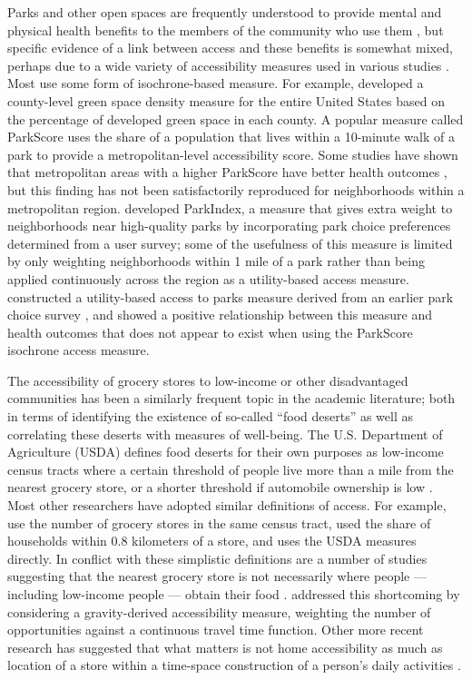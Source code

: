 \documentclass[3p, authoryear, review]{elsarticle} %
\begin{document}
Parks and other open spaces are frequently understood to provide mental and physical
health benefits to the members of the community who use them \citep{bedimo2005}, but
specific evidence of a link between access and these benefits is somewhat mixed,
perhaps due to a wide variety of accessibility measures used in various studies
\citep{bancroft2015association}. Most use some form of isochrone-based measure. For example,
\citet{neusel2016} developed a county-level green space density measure for the entire United
States based on the percentage of developed green space in each county.
A popular measure called ParkScore \citep{parkscore2019} uses the share of a
population that lives within a 10-minute walk of a park to provide a metropolitan-level
accessibility score. Some studies have shown that metropolitan areas with a higher
ParkScore have better health outcomes \citep{rigolon2018}, but this finding has not
been satisfactorily reproduced for neighborhoods within a metropolitan region.
\citet{kacynski2016} developed ParkIndex, a
measure that gives extra weight to neighborhoods near high-quality parks by
incorporating park choice preferences determined from a user survey; some of the
usefulness of this measure is limited by only weighting neighborhoods within 1
mile of a park rather than being applied continuously across the region as a utility-based
access measure. \citet{macfarlane2020} constructed a utility-based access to parks
measure derived from an earlier park choice survey \citep{kinnell2006}, and showed a
positive relationship between this measure and health outcomes that does not
appear to exist when using the ParkScore isochrone access measure.

The accessibility of grocery stores to low-income or other disadvantaged
communities has been a similarly frequent topic in the academic literature;
both in terms of identifying the existence of so-called ``food deserts'' as well
as correlating these deserts with measures of well-being. The U.S. Department of
Agriculture (USDA) defines food deserts for their own purposes as low-income census tracts
where a certain threshold of people live more than a mile from the nearest
grocery store, or a shorter threshold if automobile ownership is low \citep{usdafara}.
Most other researchers have adopted similar definitions of access. For example,
\citet{morland2002} use the number of grocery stores in the same census tract, \citet{algert2006}
used the share of households within 0.8 kilometers of a store, and \citet{hamidi2020}
uses the USDA measures directly.
In conflict with these simplistic definitions are
a number of studies suggesting that the nearest grocery store is not necessarily
where people --- including low-income people --- obtain their food
\citep{recker1978, clifton2004, aggarwal2014}. \citet{wood2016} addressed this shortcoming
by considering a gravity-derived accessibility measure, weighting the number of
opportunities against a continuous travel time function. Other more recent research
has suggested that what matters
is not home accessibility as much as location of a store within a time-space construction
of a person's daily activities \citep{widener2015spatiotemporal, chen2021effects}.
\end{document}
